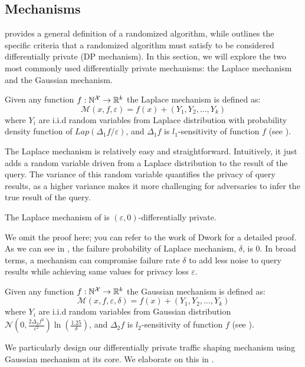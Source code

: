 \subsection{Mechanisms}\label{subsec:background-dp-mechanism}
 provides a general definition of a randomized algorithm, while  outlines the specific criteria that a randomized algorithm must satisfy to be considered differentially private (\ie DP mechanism).
In this section, we will explore the two most commonly used differentially private mechanisms: the Laplace mechanism and the Gaussian mechanism\cite{dwork2014algorithmic}.
\begin{definition}\label{def:laplace-mechanism}
  Given any function $f: \mathbb{N}^\mathcal{X} \rightarrow \mathbb{R}^k$ the Laplace mechanism is defined as:
  \begin{equation*}
    \mathcal{M}(x, f, \varepsilon) = f(x) + (Y_1, Y_2, \dots, Y_k)
  \end{equation*}
  where $Y_i$ are i.i.d random variables from Laplace distribution with probability density function of $Lap(\Delta_1 f/\varepsilon)$, and $\Delta_1 f$ is $l_1$-sensitivity of function $f$ (see ).
\end{definition}
The Laplace mechanism is relatively easy and straightforward. 
Intuitively, it just adds a random variable driven from a Laplace distribution to the result of the query.
The variance of this random variable quantifies the privacy of query results, as a higher variance makes it more challenging for adversaries to infer the true result of the query.
\begin{proposition}
  The Laplace mechanism of  is $(\varepsilon, 0)$-differentially private. 
\end{proposition}
\noindent
We omit the proof here; you can refer to the work of Dwork for a detailed proof. 
As we can see in , the failure probability of Laplace mechanism, $\delta$, is 0.
In broad terms, a mechanism can compromise failure rate $\delta$ to add less noise to query results while achieving same values for privacy loss $\varepsilon$.
\begin{definition}\label{def:gaussian-mechanism}
  Given any function $f: \mathbb{N}^\mathcal{X} \rightarrow \mathbb{R}^k$ the Gaussian mechanism is defined as:
  \begin{equation*}
    \mathcal{M}(x, f, \varepsilon, \delta) = f(x) + (Y_1, Y_2, \dots, Y_k)
  \end{equation*}
  where $Y_i$ are i.i.d random variables from Gaussian distribution $\mathcal{N}(0, \frac{2\Delta_2 f^2}{\varepsilon^2})\ln(\frac{1.25}{\delta})$, and $\Delta_2 f$ is $l_2$-sensitivity of function $f$ (see ).
\end{definition}
We particularly design our differentially private traffic shaping mechanism using Gaussian mechanism at its core. 
We elaborate on this in . 
